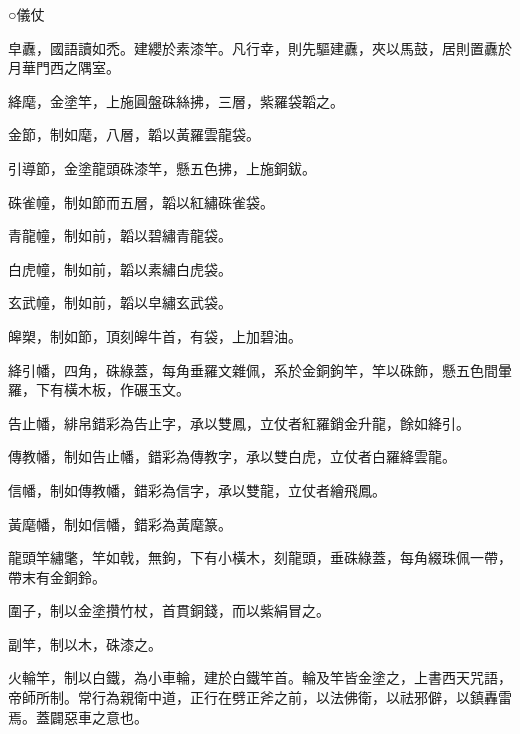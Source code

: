 
\begin{pinyinscope}

 ○儀仗



 皁纛，國語讀如禿。建纓於素漆竿。凡行幸，則先驅建纛，夾以馬鼓，居則置纛於月華門西之隅室。



 絳麾，金塗竿，上施圓盤硃絲拂，三層，紫羅袋韜之。



 金節，制如麾，八層，韜以黃羅雲龍袋。



 引導節，金塗龍頭硃漆竿，懸五色拂，上施銅鈸。



 硃雀幢，制如節而五層，韜以紅繡硃雀袋。



 青龍幢，制如前，韜以碧繡青龍袋。



 白虎幢，制如前，韜以素繡白虎袋。



 玄武幢，制如前，韜以皁繡玄武袋。



 皞槊，制如節，頂刻皞牛首，有袋，上加碧油。



 絳引幡，四角，硃綠蓋，每角垂羅文雜佩，系於金銅鉤竿，竿以硃飾，懸五色間暈羅，下有橫木板，作碾玉文。



 告止幡，緋帛錯彩為告止字，承以雙鳳，立仗者紅羅銷金升龍，餘如絳引。



 傳教幡，制如告止幡，錯彩為傳教字，承以雙白虎，立仗者白羅絳雲龍。



 信幡，制如傳教幡，錯彩為信字，承以雙龍，立仗者繪飛鳳。



 黃麾幡，制如信幡，錯彩為黃麾篆。



 龍頭竿繡氅，竿如戟，無鉤，下有小橫木，刻龍頭，垂硃綠蓋，每角綴珠佩一帶，帶末有金銅鈴。



 圍子，制以金塗攢竹杖，首貫銅錢，而以紫絹冒之。



 副竿，制以木，硃漆之。



 火輪竿，制以白鐵，為小車輪，建於白鐵竿首。輪及竿皆金塗之，上書西天咒語，帝師所制。常行為親衛中道，正行在劈正斧之前，以法佛衛，以祛邪僻，以鎮轟雷焉。蓋闢惡車之意也。




\end{pinyinscope}
